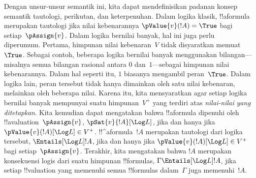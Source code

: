 \documentclass[../../../include/open-logic-section]{subfiles}
\begin{document}
Dengan unsur-unsur semantik ini, kita dapat mendefinisikan padanan konsep
semantik tautologi, perikutan, dan keterpenuhan. Dalam logika klasik,
!!a{formula} merupakan tautologi jika nilai kebenarannya
$\pValue{v}(!A)=\True$ bagi setiap~$\pAssign{v}$. Dalam logika bernilai
banyak, hal ini juga perlu diperumum. Pertama, himpunan nilai kebenaran~$V$
tidak disyaratkan memuat~$\True$. Sebagai contoh, beberapa logika bernilai
banyak menggunakan bilangan---misalnya semua bilangan rasional antara $0$
dan~$1$---sebagai himpunan nilai kebenarannya. Dalam hal seperti itu, $1$
biasanya mengambil peran~$\True$. Dalam logika lain, peran tersebut tidak
hanya dimainkan oleh satu nilai kebenaran, melainkan oleh beberapa nilai.
Karena itu, kita mensyaratkan agar setiap logika bernilai banyak mempunyai
suatu himpunan~$V^+$ yang terdiri atas \emph{nilai-nilai yang ditetapkan}.
Kita kemudian dapat mengatakan bahwa !!a{formula} dipenuhi oleh
!!a{valuation}~$\pAssign{v}$, $\pSat{v}{!A}[\Log L]$, jika dan hanya jika
$\pValue{v}(!A)[\Log L]\in V^+$. !!^a{formula}~$!A$ merupakan tautologi
dari logika tersebut, $\Entails[\Log L] !A$, jika dan hanya jika
$\pValue{v}(!A)[\Log L]\in V^+$ bagi setiap~$\pAssign{v}$. Terakhir, kita
mengatakan bahwa $!A$ merupakan konsekuensi logis dari suatu himpunan
!!{formula}s, $\Gamma\Entails[\Log L]!A$, jika setiap !!{valuation} yang
memenuhi semua !!{formula}s dalam~$\Gamma$ juga memenuhi~$!A$.
\end{document}
